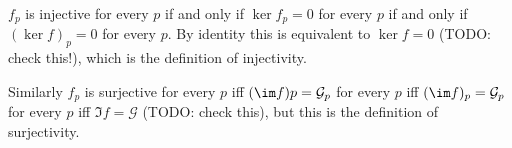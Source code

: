 $f_p$ is injective for every $p$ if and only if $\ker f_p = 0$ for every $p$
if and only if $(\ker f)_p = 0$ for every $p$. By identity this is equivalent
to $\ker f = 0$ (TODO: check this!), which is the definition of injectivity.

Similarly $f_p$ is surjective for every $p$ iff $(\im f)p = \mathcal{G}_p$ for every $p$
iff $(\im f)_p = \mathcal{G}_p$ for every $p$ iff $\Im f = \mathcal{G}$ (TODO: check this),
but this is the definition of surjectivity.
